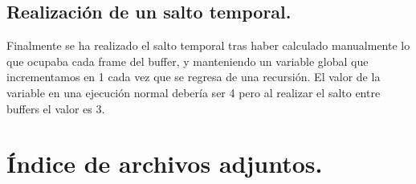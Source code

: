 \documentclass[12pt,a4paper,titlepage]{article}
\begin{document}
\subsection{Realización de un salto temporal.}
Finalmente se ha realizado el salto temporal tras haber calculado manualmente lo que
ocupaba cada frame del buffer, y manteniendo un variable global que incrementamos en 1
cada vez que se regresa de una recursión. El valor de la variable en una ejecución normal
debería ser 4 pero al realizar el salto entre buffers el valor es 3.


\newpage

\section{Índice de archivos adjuntos.}
\end{document}
